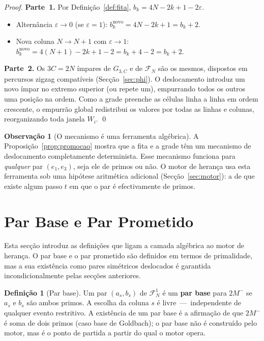 \documentclass[12pt, a4paper]{article}
\theoremstyle{plain}
\theoremstyle{definition}
\newtheorem{definition}[theorem]{Definição}
\newtheorem{remark}[theorem]{Observação}
\theoremstyle{remark}
\begin{document}
	\begin{proof}
		\textbf{Parte~1.}
		Por Definição~\ref{def:fita}, $b_k=4N-2k+1-2\varepsilon$.
		\begin{itemize}
			\item Alternância $\varepsilon\to0$ (se $\varepsilon=1$):
			$b_k^{\text{novo}}=4N-2k+1=b_k+2$. \checkmark
			\item Nova coluna $N\to N+1$ com $\varepsilon\to1$:
			$b_k^{\text{novo}}=4(N+1)-2k+1-2=b_k+4-2=b_k+2$. \checkmark
		\end{itemize}
		
		\textbf{Parte~2.}
		Os $3C=2N$ ímpares de $G_{3,C}$ e de $\mathcal{F}_N$ são os
		mesmos, dispostos em percursos zigzag compatíveis (Secção~\ref{sec:phi}).
		O deslocamento introduz um novo ímpar no extremo superior
		(ou repete um), empurrando todos os outros uma posição na ordem.
		Como a grade preenche as células linha a linha em ordem crescente,
		o empurrão global redistribui os valores por todas as linhas e
		colunas, reorganizando toda janela $W_i$. \qed
	\end{proof}
	
	\begin{remark}[O mecanismo é uma ferramenta algébrica]
		A Proposição~\ref{prop:promocao} mostra que a fita e a grade
		têm um mecanismo de deslocamento completamente determinista.
		Esse mecanismo funciona para \emph{qualquer} par $(e_1,e_3)$,
		seja ele de primos ou não.  O motor de herança usa esta ferramenta
		sob uma hipótese aritmética adicional (Secção~\ref{sec:motor}):
		a de que existe algum passo $t$ em que o par é efectivamente de
		primos.
	\end{remark}
	
	\section{Par Base e Par Prometido}
	\label{sec:pares}
	
	Esta secção introduz as definições que ligam a camada algébrica ao
	motor de herança.  O par base e o par prometido são definidos em
	termos de primalidade, mas a sua existência como pares simétricos
	deslocados é garantida incondicionalmente pelas secções anteriores.
	
	\begin{definition}[Par base]
		\label{def:base}
		Um par $(a_s,b_s)$ de $\mathcal{F}_N^1$ é um \textbf{par base}
		para $2M^-$ se $a_s$ e $b_s$ são ambos primos.  A escolha da
		coluna $s$ é livre~---~independente de qualquer evento restritivo.
		A existência de um par base é a afirmação de que $2M^-$ é soma
		de dois primos (caso base de Goldbach); o par base não é
		construído pelo motor, mas é o ponto de partida a partir do qual
		o motor opera.
	\end{definition}
	
\end{document}
